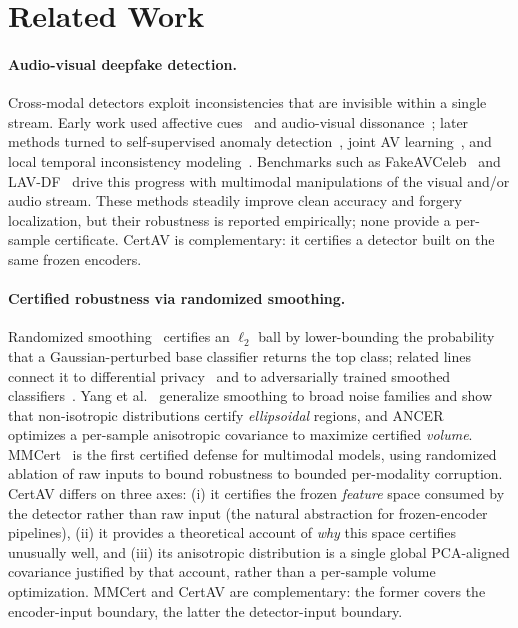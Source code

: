 \section{Related Work}
\label{sec:related}

\paragraph{Audio-visual deepfake detection.}
Cross-modal detectors exploit inconsistencies that are invisible within a single stream. Early work used affective cues~\cite{mittal2020emotions} and audio-visual dissonance~\cite{chugh2020not}; later methods turned to self-supervised anomaly detection~\cite{feng2023self}, joint AV learning~\cite{yang2023avoid}, and local temporal inconsistency modeling~\cite{astrid2025local}. Benchmarks such as FakeAVCeleb~\cite{khalid2021fakeavceleb} and LAV-DF~\cite{cai2022lavdf} drive this progress with multimodal manipulations of the visual and/or audio stream. These methods steadily improve clean accuracy and forgery localization, but their robustness is reported empirically; none provide a per-sample certificate. CertAV is complementary: it certifies a detector built on the same frozen encoders.

\paragraph{Certified robustness via randomized smoothing.}
Randomized smoothing~\cite{cohen2019certified} certifies an $\ell_2$ ball by lower-bounding the probability that a Gaussian-perturbed base classifier returns the top class; related lines connect it to differential privacy~\cite{lecuyer2019certified} and to adversarially trained smoothed classifiers~\cite{salman2019provably}. Yang et al.~\cite{yang2020randomized} generalize smoothing to broad noise families and show that non-isotropic distributions certify \emph{ellipsoidal} regions, and ANCER~\cite{eiras2022ancer} optimizes a per-sample anisotropic covariance to maximize certified \emph{volume}. MMCert~\cite{wang2024mmcert} is the first certified defense for multimodal models, using randomized ablation of raw inputs to bound robustness to bounded per-modality corruption. CertAV differs on three axes: (i) it certifies the frozen \emph{feature} space consumed by the detector rather than raw input (the natural abstraction for frozen-encoder pipelines), (ii) it provides a theoretical account of \emph{why} this space certifies unusually well, and (iii) its anisotropic distribution is a single global PCA-aligned covariance justified by that account, rather than a per-sample volume optimization. MMCert and CertAV are complementary: the former covers the encoder-input boundary, the latter the detector-input boundary.

